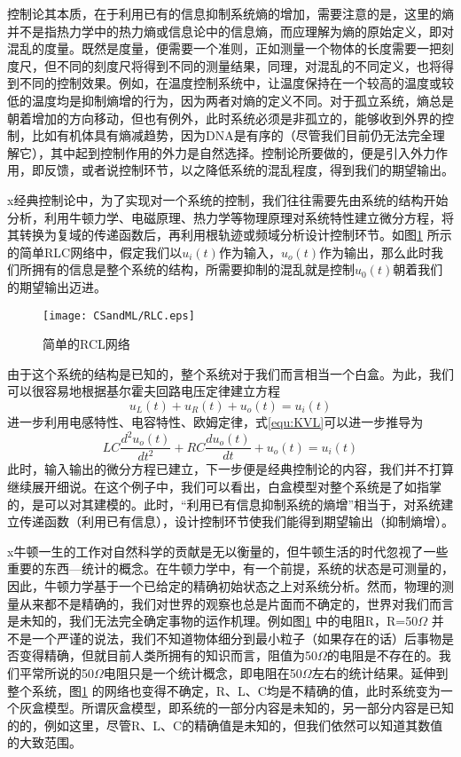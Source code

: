 控制论其本质，在于利用已有的信息抑制系统熵的增加，需要注意的是，这里的熵并不是指热力学中的热力熵或信息论中的信息熵，而应理解为熵的原始定义，即对混乱的度量。既然是度量，便需要一个准则，正如测量一个物体的长度需要一把刻度尺，但不同的刻度尺将得到不同的测量结果，同理，对混乱的不同定义，也将得到不同的控制效果。例如，在温度控制系统中，让温度保持在一个较高的温度或较低的温度均是抑制熵增的行为，因为两者对熵的定义不同。对于孤立系统，熵总是朝着增加的方向移动，但也有例外，此时系统必须是非孤立的，能够收到外界的控制，比如有机体具有熵减趋势，因为DNA是有序的（尽管我们目前仍无法完全理解它），其中起到控制作用的外力是自然选择。控制论所要做的，便是引入外力作用，即反馈，或者说控制环节，以之降低系统的混乱程度，得到我们的期望输出。

x经典控制论中，为了实现对一个系统的控制，我们往往需要先由系统的结构开始分析，利用牛顿力学、电磁原理、热力学等物理原理对系统特性建立微分方程，将其转换为复域的传递函数后，再利用根轨迹或频域分析设计控制环节。如图\ref{img:RLC} 所示的简单RLC网络中，假定我们以$u_i(t)$作为输入，$u_o(t)$作为输出，那么此时我们所拥有的信息是整个系统的结构，所需要抑制的混乱就是控制$u_0(t)$朝着我们的期望输出迈进。

\begin{figure}[htbp]\label{img:RLC}
\centering
\texttt{[image: CSandML/RLC.eps]}
\caption{简单的RCL网络}
\end{figure}

由于这个系统的结构是已知的，整个系统对于我们而言相当一个白盒。为此，我们可以很容易地根据基尔霍夫回路电压定律建立方程
\begin{equation}\label{equ:KVL}
u_L(t) + u_R(t) + u_o(t) = u_i(t)
\end{equation}
进一步利用电感特性、电容特性、欧姆定律，式\eqref{equ:KVL}可以进一步推导为
\begin{equation}
LC\frac{d^2u_o(t)}{dt^2} + RC\frac{du_o(t)}{dt}  + u_o(t) = u_i(t)
\end{equation}
此时，输入输出的微分方程已建立，下一步便是经典控制论的内容，我们并不打算继续展开细说。在这个例子中，我们可以看出，白盒模型对整个系统是了如指掌的，是可以对其建模的。此时，“利用已有信息抑制系统的熵增”相当于，对系统建立传递函数（利用已有信息），设计控制环节使我们能得到期望输出（抑制熵增）。

x牛顿一生的工作对自然科学的贡献是无以衡量的，但牛顿生活的时代忽视了一些重要的东西---统计的概念。在牛顿力学中，有一个前提，系统的状态是可测量的，因此，牛顿力学基于一个已给定的精确初始状态之上对系统分析。然而，物理的测量从来都不是精确的，我们对世界的观察也总是片面而不确定的，世界对我们而言是未知的，我们无法完全确定事物的运作机理。例如图\ref{img:RLC} 中的电阻R，R=50$\Omega$ 并不是一个严谨的说法，我们不知道物体细分到最小粒子（如果存在的话）后事物是否变得精确，但就目前人类所拥有的知识而言，阻值为50$\Omega$的电阻是不存在的。我们平常所说的50$\Omega$电阻只是一个统计概念，即电阻在50$\Omega$左右的统计结果。延伸到整个系统，图\ref{img:RLC} 的网络也变得不确定，R、L、C均是不精确的值，此时系统变为一个灰盒模型。所谓灰盒模型，即系统的一部分内容是未知的，另一部分内容是已知的的，例如这里，尽管R、L、C的精确值是未知的，但我们依然可以知道其数值的大致范围。

